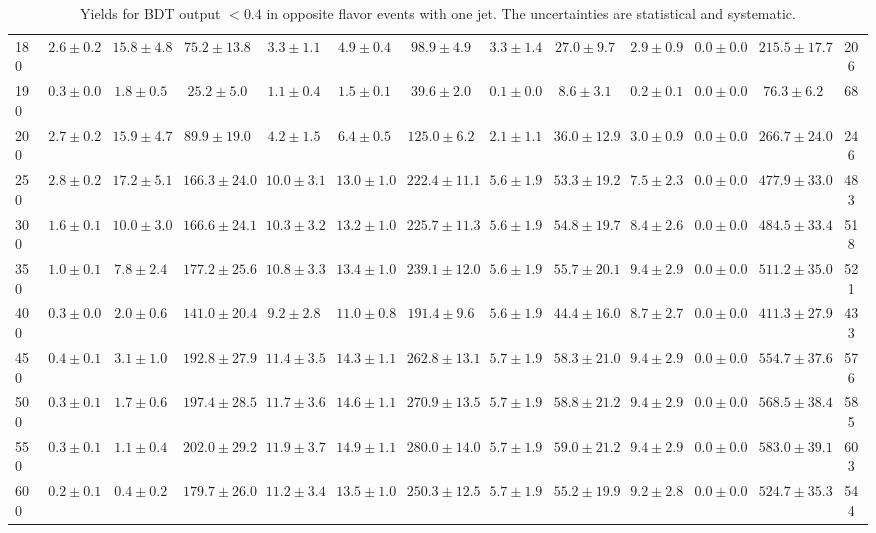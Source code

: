 \begin{table}
{\begin{center}
\begin{tabular}{l | c c | c c c c c c c c  | c c}
180 & $2.6\pm0.2$ & $15.8\pm4.8$ & $75.2\pm13.8$ & $3.3\pm1.1$ & $4.9\pm0.4$ & $98.9\pm4.9$ & $3.3\pm1.4$ & $27.0\pm9.7$ & $2.9\pm0.9$ & $0.0\pm0.0$ & $215.5\pm17.7$ & 206 \\
190 & $0.3\pm0.0$ & $1.8\pm0.5$ & $25.2\pm5.0$ & $1.1\pm0.4$ & $1.5\pm0.1$ & $39.6\pm2.0$ & $0.1\pm0.0$ & $8.6\pm3.1$ & $0.2\pm0.1$ & $0.0\pm0.0$ & $76.3\pm6.2$ & 68 \\
200 & $2.7\pm0.2$ & $15.9\pm4.7$ & $89.9\pm19.0$ & $4.2\pm1.5$ & $6.4\pm0.5$ & $125.0\pm6.2$ & $2.1\pm1.1$ & $36.0\pm12.9$ & $3.0\pm0.9$ & $0.0\pm0.0$ & $266.7\pm24.0$ & 246 \\
250 & $2.8\pm0.2$ & $17.2\pm5.1$ & $166.3\pm24.0$ & $10.0\pm3.1$ & $13.0\pm1.0$ & $222.4\pm11.1$ & $5.6\pm1.9$ & $53.3\pm19.2$ & $7.5\pm2.3$ & $0.0\pm0.0$ & $477.9\pm33.0$ & 483 \\
300 & $1.6\pm0.1$ & $10.0\pm3.0$ & $166.6\pm24.1$ & $10.3\pm3.2$ & $13.2\pm1.0$ & $225.7\pm11.3$ & $5.6\pm1.9$ & $54.8\pm19.7$ & $8.4\pm2.6$ & $0.0\pm0.0$ & $484.5\pm33.4$ & 518 \\
350 & $1.0\pm0.1$ & $7.8\pm2.4$ & $177.2\pm25.6$ & $10.8\pm3.3$ & $13.4\pm1.0$ & $239.1\pm12.0$ & $5.6\pm1.9$ & $55.7\pm20.1$ & $9.4\pm2.9$ & $0.0\pm0.0$ & $511.2\pm35.0$ & 521 \\
400 & $0.3\pm0.0$ & $2.0\pm0.6$ & $141.0\pm20.4$ & $9.2\pm2.8$ & $11.0\pm0.8$ & $191.4\pm9.6$ & $5.6\pm1.9$ & $44.4\pm16.0$ & $8.7\pm2.7$ & $0.0\pm0.0$ & $411.3\pm27.9$ & 433 \\
450 & $0.4\pm0.1$ & $3.1\pm1.0$ & $192.8\pm27.9$ & $11.4\pm3.5$ & $14.3\pm1.1$ & $262.8\pm13.1$ & $5.7\pm1.9$ & $58.3\pm21.0$ & $9.4\pm2.9$ & $0.0\pm0.0$ & $554.7\pm37.6$ & 576 \\
500 & $0.3\pm0.1$ & $1.7\pm0.6$ & $197.4\pm28.5$ & $11.7\pm3.6$ & $14.6\pm1.1$ & $270.9\pm13.5$ & $5.7\pm1.9$ & $58.8\pm21.2$ & $9.4\pm2.9$ & $0.0\pm0.0$ & $568.5\pm38.4$ & 585 \\
550 & $0.3\pm0.1$ & $1.1\pm0.4$ & $202.0\pm29.2$ & $11.9\pm3.7$ & $14.9\pm1.1$ & $280.0\pm14.0$ & $5.7\pm1.9$ & $59.0\pm21.2$ & $9.4\pm2.9$ & $0.0\pm0.0$ & $583.0\pm39.1$ & 603 \\
600 & $0.2\pm0.1$ & $0.4\pm0.2$ & $179.7\pm26.0$ & $11.2\pm3.4$ & $13.5\pm1.0$ & $250.3\pm12.5$ & $5.7\pm1.9$ & $55.2\pm19.9$ & $9.2\pm2.8$ & $0.0\pm0.0$ & $524.7\pm35.3$ & 544 \\
\hline
\end{tabular}
\end{center}
\label{tab:yields_bdtlo_1j}
\caption{Yields for BDT output $<0.4$ in opposite flavor events with one jet. The uncertainties are statistical and systematic.}}
\end{table}

